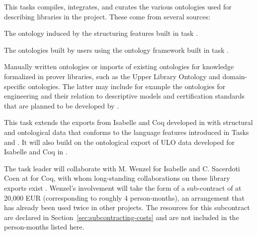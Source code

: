 \begin{workpackage}
\begin{tasklist}
\begin{task}[id=strrefonto,title=Reference Ontology,lead=Sac,FauRM=6,SacRM=6,wphases=12-36!.5]
This tasks compiles, integrates, and curates the various ontologies used for describing libraries in the project.
These come from several sources:
\begin{compactitem}
 \item The ontology induced by the structuring features built in task .
 \item The ontologies built by users using the ontology framework built in task .
 \item Manually written ontologies or imports of existing ontologies for knowledge formalized in prover libraries, such as the Upper Library Ontology \cite{CKMRSW:ulo:19} and domain-specific ontologies.
 The latter may include for example the ontologies for engineering and their relation to descriptive models and certification standards that are planned to be developed by .
\end{compactitem}
\end{task}

\begin{task}[id=strontorepml,title=Ontological Representation of Formal Libraries,lead=Fau,FauRM=6,BolRM=4,SacRM=5,wphases=12-48!.5]
This task extends the exports from Isabelle and Coq developed in  with structural and ontological data that conforms to the language features introduced in Tasks~ and .
It will also build on the ontological export of ULO data developed for Isabelle and Coq in \cite{CKMRSW:ulo:19}.

The task leader will collaborate with M. Wenzel for Isabelle and C. Sacerdoti Coen at  for Coq, with whom long-standing collaborations on these library exports exist \cite{MRS:coq:19,CKMRSW:ulo:19,KRW:isabelle:19}.
Wenzel's involvement will take the form of a sub-contract of  at 20,000 EUR (corresponding to roughly 4 person-months), an arrangement that has already been used twice in other projects.
The resources for this subcontract are declared in Section~\ref{sec:subcontracting-costs} and are not included in the person-months listed here.
\end{task}



\end{tasklist}
\end{workpackage}
